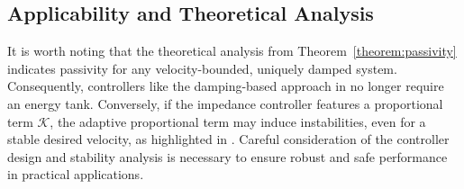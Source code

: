 \subsection{Applicability and Theoretical Analysis}
It is worth noting that the theoretical analysis from Theorem~\ref{theorem:passivity} indicates passivity for any velocity-bounded, uniquely damped system. Consequently, controllers like the damping-based approach in \cite{kronander2015passive} no longer require an energy tank. Conversely, if the impedance controller features a proportional term $\mathcal{K}$, the adaptive proportional term may induce instabilities, even for a stable desired velocity, as highlighted in \cite{ferraguti2013tank, kronander2016stability}. Careful consideration of the controller design and stability analysis is necessary to ensure robust and safe performance in practical applications.
